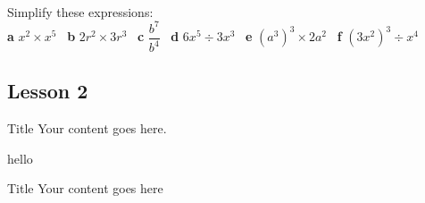 \documentclass[fleqn]{article}
\begin{document}


\begin{examplebox}{}{}
    \\ %
    Simplify these expressions:                                 \\
    \textbf{a}\hspace{2mm} $x^2 \times x^5$        \hspace{7mm} \
    \textbf{b}\hspace{2mm} $2r^2 \times 3r^3$      \hspace{7mm} \
    \textbf{c}\hspace{2mm} $\dfrac{b^7}{b^4}$      \hspace{7mm} \
    \textbf{d}\hspace{2mm} $6x^5 \div 3x^3$        \hspace{7mm} \
    \textbf{e}\hspace{2mm} $(a^3)^3 \times 2a^2$   \hspace{7mm} \
    \textbf{f}\hspace{2mm} $(3x^2)^3 \div x^4$
\end{examplebox}


\subsection{Lesson 2}
\begin{note*}{Title}{}
    Your content goes here.
\end{note*}

\begin{examplebox}{}{}
    hello
\end{examplebox}


\exercise{}

\newpage

\begin{mybox2}[colbacktitle=WildStrawberry]{Title}
    Your content goes here
\end{mybox2}
\end{document}
